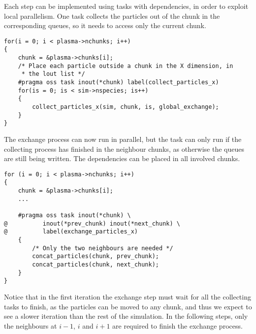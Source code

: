 Each step can be implemented using tasks with dependencies, in order to exploit 
local parallelism. One task collects the particles out of the chunk in the 
corresponding queues, so it needs to access only the current chunk.
%
\begin{lstlisting}
for(i = 0; i < plasma->nchunks; i++)
{
	chunk = &plasma->chunks[i];
	/* Place each particle outside a chunk in the X dimension, in
	 * the lout list */
	#pragma oss task inout(*chunk) label(collect_particles_x)
	for(is = 0; is < sim->nspecies; is++)
	{
		collect_particles_x(sim, chunk, is, global_exchange);
	}
}
\end{lstlisting}
%
The exchange process can now run in parallel, but the task can only run if the 
collecting process has finished in the neighbour chunks, as otherwise the queues 
are still being written. The dependencies can be placed in all involved chunks.
%
\begin{lstlisting}
for (i = 0; i < plasma->nchunks; i++)
{
	chunk = &plasma->chunks[i];
	...

	#pragma oss task inout(*chunk) \
@          inout(*prev_chunk) inout(*next_chunk) \
@          label(exchange_particles_x)
	{
		/* Only the two neighbours are needed */
		concat_particles(chunk, prev_chunk);
		concat_particles(chunk, next_chunk);
	}
}
\end{lstlisting}
%
Notice that in the first iteration the exchange step must wait for all the 
collecting tasks to finish, as the particles can be moved to any chunk, and thus 
we expect to see a slower iteration than the rest of the simulation. In the 
following steps, only the neighbours at $i-1$, $i$ and $i+1$ are required to 
finish the exchange process.

